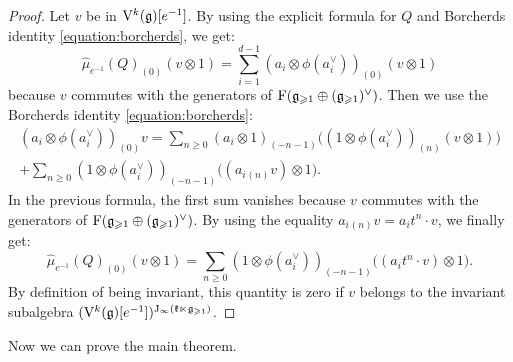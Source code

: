 \begin{proof}
	Let $v$ be in $\mathrm V^k(\mathfrak g)[e^{-1}]$. By using the explicit formula for $Q$ and Borcherds identity \eqref{equation:borcherds}, we get:
	\[ \widehat\mu_{e^{-1}}(Q)_{(0)} (v \otimes 1) = \sum_{i=1}^{d-1} (a_i \otimes \phi(a_i^\vee))_{(0)} (v \otimes 1) \]
	because $v$ commutes with the generators of $\mathrm F(\mathfrak g_{\geqslant 1} \oplus (\mathfrak g_{\geqslant 1})^\vee)$. Then we use the Borcherds identity \eqref{equation:borcherds}:
	\[ \begin{multlined}
		(a_i \otimes \phi(a_i^\vee))_{(0)} v = \sum_{n \geqslant 0} (a_i \otimes 1)_{(-n - 1)} \big((1 \otimes \phi(a_i^\vee))_{(n)} (v \otimes 1)\big) \\
		+ \sum_{n \geqslant 0} (1 \otimes \phi(a_i^\vee))_{(-n - 1)} \big((a_i{}_{(n)} v) \otimes 1\big).
	\end{multlined}  \] 
	In the previous formula, the first sum vanishes because $v$ commutes with the generators of $\mathrm F(\mathfrak g_{\geqslant 1} \oplus (\mathfrak g_{\geqslant 1})^\vee)$. By using the equality $a_i{}_{(n)} v = a_i t^n \cdot v$, we finally get:
	\[ \widehat\mu_{e^{-1}}(Q)_{(0)} (v \otimes 1) =  \sum_{n \geqslant 0} (1 \otimes \phi(a_i^\vee))_{(-n - 1)} \big((a_i t^n \cdot v) \otimes 1\big). \]
	By definition of being invariant, this quantity is zero if $v$ belongs to the invariant subalgebra $(\mathrm V^k(\mathfrak g)[e^{-1}])^{\mathrm{J}_\infty(\mathfrak k \ltimes \mathfrak g_{\geqslant 1})}$.
\end{proof}

Now we can prove the main theorem.


